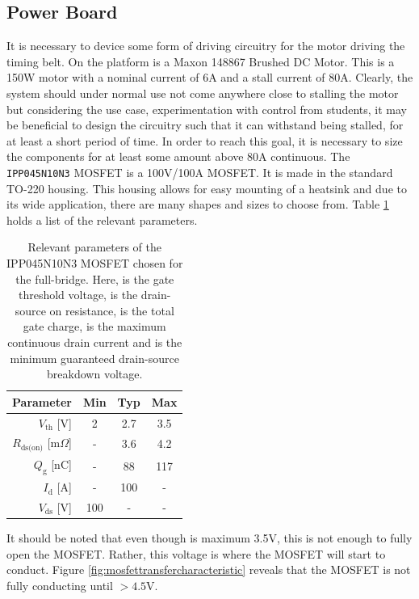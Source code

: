 \subsection{Power Board} %
\label{sub:power_board}
It is necessary to device some form of driving circuitry for the motor driving the timing belt.
On the platform is a Maxon 148867 Brushed DC Motor.
This is a 150W motor with a nominal current of 6A and a stall current of 80A.
Clearly, the system should under normal use not come anywhere close to stalling the motor but considering the use case, experimentation with control from students, it may be beneficial to design the circuitry such that it can withstand being stalled, for at least a short period of time.
In order to reach this goal, it is necessary to size the components for at least some amount above 80A continuous.
The \texttt{IPP045N10N3} MOSFET \cite{mosfet} is a 100V/100A MOSFET.
It is made in the standard TO-220 housing.
This housing allows for easy mounting of a heatsink and due to its wide application, there are many shapes and sizes to choose from.
Table \ref{tab:mosfetparameters} holds a list of the relevant parameters.

\begin{table}[tb]
	\centering
	\begin{tabular}{|r|c|c|c|}
	\hline
		\textbf{Parameter} & \textbf{Min} & \textbf{Typ} & \textbf{Max} \\
	\hline
		$V_{\text{th}}$ [V] & 2 & 2.7 & 3.5 \\
	\hline
		$R_{\text{ds(on)}}$ [m$\Omega$]& - & 3.6 & 4.2 \\
	\hline
		$Q_\text{g}$ [nC] & - & 88 & 117 \\
	\hline
		$I_\text{d}$ [A] & - & 100 & - \\
	\hline
		$V_{\text{ds}}$ [V] & 100 & - & - \\
	\hline
	\end{tabular}
	\caption{Relevant parameters of the IPP045N10N3 MOSFET \cite{mosfet} chosen for the full-bridge.
	Here, \vth is the gate threshold voltage, \ron is the drain-source on resistance, \qg is the total gate charge, \id is the maximum continuous drain current and \vds is the minimum guaranteed drain-source breakdown voltage.}
	\label{tab:mosfetparameters}
\end{table}

It should be noted that even though \vth is maximum 3.5V, this is not enough to fully open the MOSFET.
Rather, this voltage is where the MOSFET will start to conduct.
Figure \ref{fig:mosfettransfercharacteristic} reveals that the MOSFET is not fully conducting until \vgs $>4.5$V.

